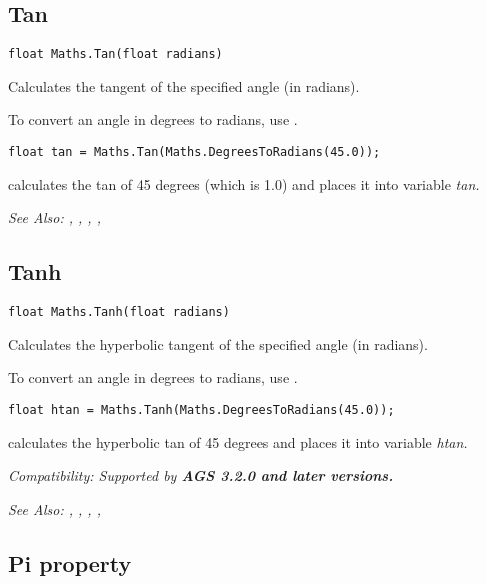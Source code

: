 \subsection{Tan}\label{Maths.Tan}%

\begin{verbatim}
float Maths.Tan(float radians)
\end{verbatim}
Calculates the tangent of the specified angle (in radians).

To convert an angle in degrees to radians, use .

\begin{verbatim}
float tan = Maths.Tan(Maths.DegreesToRadians(45.0));
\end{verbatim}
calculates the tan of 45 degrees (which is 1.0) and places it into variable \it{tan}.

\it{See Also:} ,
,
,
, 


\subsection{Tanh}\label{Maths.Tanh}%

\begin{verbatim}
float Maths.Tanh(float radians)
\end{verbatim}
Calculates the hyperbolic tangent of the specified angle (in radians).

To convert an angle in degrees to radians, use .

\begin{verbatim}
float htan = Maths.Tanh(Maths.DegreesToRadians(45.0));
\end{verbatim}
calculates the hyperbolic tan of 45 degrees and places it into variable \it{htan}.

\it{Compatibility:} Supported by \bf{AGS 3.2.0} and later versions.

\it{See Also:} ,
,
,
, 


\subsection{Pi property}\label{Maths.Pi}%

